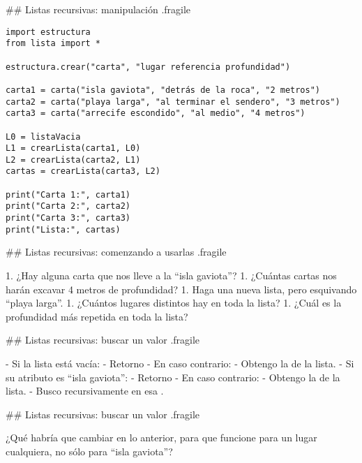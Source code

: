 ## Listas recursivas: manipulación {.fragile}


\begin{lstlisting}[style=frame03]
import estructura
from lista import *

estructura.crear("carta", "lugar referencia profundidad")

carta1 = carta("isla gaviota", "detrás de la roca", "2 metros")
carta2 = carta("playa larga", "al terminar el sendero", "3 metros")
carta3 = carta("arrecife escondido", "al medio", "4 metros")

L0 = listaVacia
L1 = crearLista(carta1, L0)
L2 = crearLista(carta2, L1)
cartas = crearLista(carta3, L2)

print("Carta 1:", carta1)
print("Carta 2:", carta2)
print("Carta 3:", carta3)
print("Lista:", cartas)
\end{lstlisting}


## Listas recursivas: comenzando a usarlas {.fragile}


1. ¿Hay alguna carta que nos lleve a la ``isla gaviota''?
1. ¿Cuántas cartas nos harán excavar 4 metros de profundidad?
1. Haga una nueva lista, pero esquivando ``playa larga''.
1. ¿Cuántos lugares distintos hay en toda la lista?
1. ¿Cuál es la profundidad más repetida en toda la lista?

## Listas recursivas: buscar un valor {.fragile}


\vspace{1ex}

- Si la lista está vacía:
    - Retorno 
- En caso contrario:
    - Obtengo la  de la lista.
    - Si su atributo   es ``isla gaviota'':
        - Retorno 
    - En caso contrario:
        - Obtengo la  de la lista.
        - Busco recursivamente en esa .

## Listas recursivas: buscar un valor {.fragile}


\bgnblockidea
{}
    ¿Qué habría que cambiar en lo anterior, para que funcione para un lugar
    cualquiera, no sólo para ``isla gaviota''?
\trmblockidea

